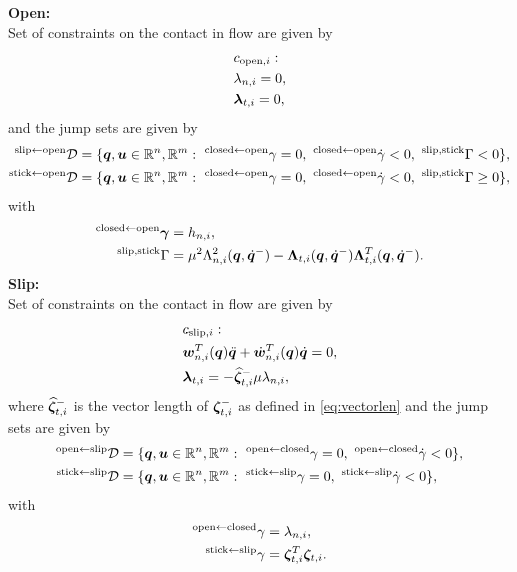 \documentclass[../DC2017114Bouma.tex]{subfiles}
\begin{document}
\textbf{Open:}\\
Set of constraints on the contact in flow are given by
\begin{align}
&c_{\text{open},i}:\nonumber\\
&\lambda_{n,i} = 0,\\
&\boldsymbol{\lambda}_{t,i} = 0,
\end{align}
and the jump sets are given by
\begin{align}
^{\text{slip}\leftarrow \text{open}}\mathcal{D} &= \{\qb,\ub\in\Rbb^n,\Rbb^m:\ ^{\text{closed}\leftarrow \text{open}}\gamma = 0,\ ^{\text{closed}\leftarrow \text{open}}\dot{\gamma}<0,\ ^{\text{slip,stick}}\Gamma < 0 \},\label{eq:D0to1}\\
^{\text{stick}\leftarrow \text{open}}\mathcal{D} &= \{\qb,\ub\in\Rbb^n,\Rbb^m:\ ^{\text{closed}\leftarrow \text{open}}\gamma = 0,\ ^{\text{closed}\leftarrow \text{open}}\dot{\gamma}<0,\ ^{\text{slip,stick}}\Gamma \geq 0 \},\label{eq:D0to2}
\end{align}
with 
\begin{align}
^{\text{closed}\leftarrow \text{open}}\boldsymbol{\gamma} &= h_{n,i},\\
^{\text{slip,stick}}\Gamma &= \mu^2 \Lambda_{n,i}^2({\boldsymbol{q}},\dot{{\boldsymbol{q}}}^-) - \boldsymbol{\Lambda}_{t,i}({\boldsymbol{q}},\dot{{\boldsymbol{q}}}^-)\boldsymbol{\Lambda}_{t,i}^T({\boldsymbol{q}},\dot{{\boldsymbol{q}}}^-).
\end{align}
\textbf{Slip:}\\
Set of constraints on the contact in flow are given by
\begin{align}
&c_{\text{slip},i}:\nonumber\\
&{\boldsymbol{w}}^T_{n,i}({\boldsymbol{q}})\ddot{{\boldsymbol{q}}} + \dot{{\boldsymbol{w}}}^T_{n,i}({\boldsymbol{q}})\dot{{\boldsymbol{q}}} = 0,\\
&\boldsymbol{\lambda}_{t,i} = -\widehat{\boldsymbol{\zeta}}^-_{t,i}\mu\lambda_{n,i},
\end{align}
where $\widehat{\boldsymbol{\zeta}}^-_{t,i}$ is the vector length of $\boldsymbol{\zeta}^-_{t,i}$ as defined in \eqref{eq:vectorlen} and the jump sets are given by
\begin{align}
^{\text{open}\leftarrow \text{slip}}\mathcal{D} &= \{{\boldsymbol{q}},{\boldsymbol{u}}\in\mathbb{R}^n,\mathbb{R}^m:\ ^{\text{open}\leftarrow \text{closed}}\gamma = 0,\ ^{\text{open}\leftarrow \text{closed}}\dot{\gamma} < 0 \},\\
^{\text{stick}\leftarrow \text{slip}}\mathcal{D} &= \{{\boldsymbol{q}},{\boldsymbol{u}}\in\mathbb{R}^n,\mathbb{R}^m:\ ^{\text{stick}\leftarrow \text{slip}}\gamma = 0,\ ^{\text{stick}\leftarrow \text{slip}}\dot{\gamma} < 0 \},
\end{align}
with
\begin{align}
^{\text{open}\leftarrow \text{closed}}\gamma &= \lambda_{n,i},\\
^{\text{stick}\leftarrow \text{slip}}\gamma &= \boldsymbol{\zeta}^T_{t,i}\boldsymbol{\zeta}_{t,i}.
\end{align}
\end{document}

